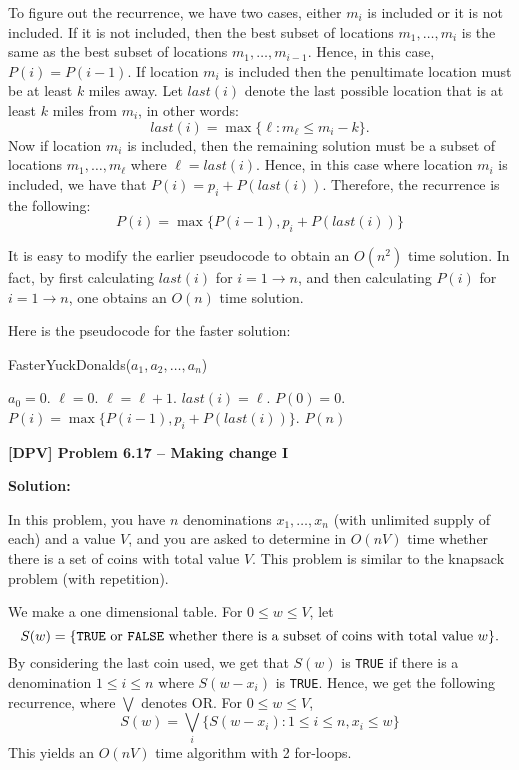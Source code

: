 \documentclass[12pt]{article}
\begin{document}
To figure out the recurrence, we have two cases, either $m_i$ is included or 
it is not included.  If it is not included, then the best subset of locations $m_1,\dots,m_i$
is the same as the best subset of locations $m_1,\dots,m_{i-1}$.  Hence, in this
case, $P(i)=P(i-1)$.  If location $m_i$ is included then the penultimate location
must be at least $k$ miles away.  Let $last(i)$ denote the last possible location 
that is at least $k$ miles from $m_i$, in other words:
\[  last(i) = \max\{\ell: m_\ell\leq m_i-k\}.
\]  Now if location $m_i$ is included, then
the remaining solution must be a subset of locations $m_1,\dots,m_\ell$
where $\ell=last(i)$.  Hence, in this case where location $m_i$ is included, we have
that $P(i) = p_i + P(last(i))$.
Therefore, the recurrence is the following:
\[
P(i) = \max\{ P(i-1), p_i + P(last(i)) \}
\]

It is easy to modify the earlier pseudocode to obtain an $O(n^2)$ time
solution.  In fact, by first calculating $last(i)$ for $i=1\rightarrow n$, 
and then calculating $P(i)$ for $i=1\rightarrow n$, one obtains an $O(n)$
time solution.

Here is the pseudocode for the faster solution:
\begin{algorithm}[h!]
\caption{FasterYuckDonalds($a_1,a_2,\dots,a_n$)}
\begin{algorithmic}
\STATE $a_0 = 0$.
\STATE $\ell = 0$.
\STATE $\ell = \ell+1$.
\ENDWHILE
\STATE $last(i) = \ell$.
\ENDFOR
\STATE $P(0) = 0$.
\STATE $P(i) = \max\{ P(i-1), p_i + P(last(i))\}$.
\ENDFOR
\RETURN $P(n)$
\end{algorithmic}
\end{algorithm}


\newpage

{\noindent \bf [DPV] Problem 6.17 --  Making change I}


{\noindent \bf Solution:}

In this problem,
 you have $n$ denominations
$x_1,\dots,x_n$ (with unlimited supply of each)
and a value $V$, and you are asked to determine in $O(nV)$ time whether there
is a set of coins with total value $V$.
This problem is similar to the knapsack problem (with repetition).

We make a one dimensional table.  For $0\le w\le V$, let
\[  S(w) = \{\mbox{{\tt TRUE} or {\tt FALSE} whether there is a subset of coins
with total value $w$}\}.
\]
By considering the last coin used, we get that $S(w)$ is {\tt TRUE} if
there is a denomination $1\le i \le n$ where $S(w-x_i)$ is {\tt TRUE}.
Hence, we get the following recurrence, where $\bigvee$ denotes OR.
For $0\le w\le V$,
\[ S(w) = \bigvee_{i}\{ S(w-x_i) :
1\le i\le n, x_i\le w\}
\]
This yields an $O(nV)$ time algorithm with 2 for-loops.
\end{document}
